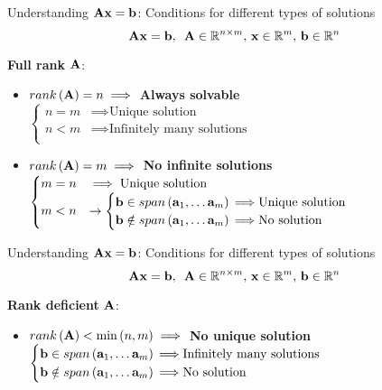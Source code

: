 \documentclass[aspectratio=169]{beamer}
\let\olditem\item
\renewcommand{\item}{\setlength{\itemsep}{\fill}\olditem}
\def\mf{\ensuremath\mathbf}
\def\mb{\ensuremath\mathbb}
\def\lp{\ensuremath\left(}
\def\rp{\ensuremath\right)}
\begin{document}
\begin{frame}[t]{Understanding $\mf{A}\mf{x} = \mf{b}$: Conditions for different types of solutions}
\[ \mf{A}\mf{x} = \mf{b}, \,\,\, \mf{A} \in \mb{R}^{n \times m}, \, \mf{x} \in \mb{R}^m, \, \mf{b} \in \mb{R}^n \]

\textbf{Full rank } $\mf{A}$:
\begin{itemize}
  \item $rank\lp \mf{A} \rp = n \implies$ \textbf{Always solvable}\\
        \vspace{0.2cm}
        $\begin{cases} 
        n = m & \implies \text{Unique solution} \\ 
        n < m & \implies \text{Infinitely many solutions} \\ 
        \end{cases}$
  \item $rank\lp \mf{A} \rp = m  \implies$ \textbf{No infinite solutions}\\
        \vspace{0.2cm}
        $\begin{cases} 
        m = n & \implies \text{Unique solution} \\ 
        m < n & \rightarrow \begin{cases}
        \mf{b} \in span\lp \mf{a}_1, \ldots \mf{a}_m \rp {\implies} \text{Unique solution} \\
        \mf{b} \notin span\lp \mf{a}_1, \ldots \mf{a}_m \rp {\implies} \text{No solution}
        \end{cases}\\ 
        \end{cases}$
\end{itemize}
\end{frame}


\begin{frame}[t]{Understanding $\mf{A}\mf{x} = \mf{b}$: Conditions for different types of solutions}
\[ \mf{A}\mf{x} = \mf{b}, \,\,\, \mf{A} \in \mb{R}^{n \times m}, \, \mf{x} \in \mb{R}^m, \, \mf{b} \in \mb{R}^n \]

\textbf{Rank deficient} $\mf{A}$:
\begin{itemize}
  \item $rank\lp \mf{A} \rp < \min \lp n, m \rp \implies$ \textbf{No unique solution}\\
        \vspace{0.2cm}
        $\begin{cases}
        \mf{b} \in span\lp \mf{a}_1, \ldots \mf{a}_m \rp {\implies} \text{Infinitely many solutions} \\
        \mf{b} \notin span\lp \mf{a}_1, \ldots \mf{a}_m \rp {\implies} \text{No solution}
        \end{cases}$
\end{itemize}
\end{frame}
\end{document}
